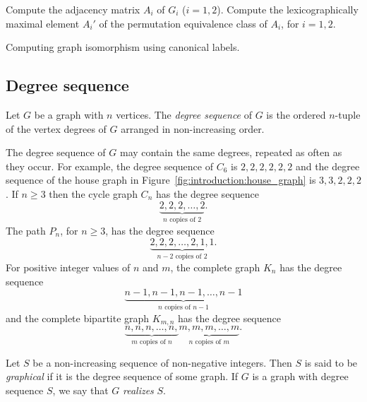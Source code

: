\begin{algorithm}[!htpb]
\dontprintsemicolon  %
\BlankLine
Compute the adjacency matrix $A_i$ of $G_i$ ($i = 1, 2$).\;
Compute the lexicographically maximal element $A_i'$ of the
permutation equivalence class of $A_i$, for $i = 1, 2$.\;
\caption{Computing graph isomorphism using canonical labels.}
\label{alg:introduction:graph_isomorphism_canonical_labels}
\end{algorithm}



\subsection{Degree sequence}

Let $G$ be a graph with $n$ vertices. The \emph{degree sequence} of
$G$ is the ordered $n$-tuple of the vertex degrees of $G$ arranged in
non-increasing order.

The degree sequence of $G$ may contain the same degrees, repeated as
often as they occur. For example, the degree sequence of $C_6$ is
$2, 2, 2, 2, 2, 2$ and the degree sequence of the house graph in
Figure~\ref{fig:introduction:house_graph} is $3, 3, 2, 2, 2$. If
$n \geq 3$ then the cycle graph $C_n$ has the degree sequence
\[
\underbrace{2, 2, 2, \dots, 2}_{n \text{ copies of } 2}.
\]
The path $P_n$, for $n \geq 3$, has the degree sequence
\[
\underbrace{2, 2, 2, \dots, 2, 1, 1}_{n - 2 \text{ copies of } 2}.
\]
For positive integer values of $n$ and $m$, the complete graph $K_n$
has the degree sequence
\[
\underbrace{n-1, n-1, n-1, \dots, n-1}_{n \text{ copies of } n-1}
\]
and the complete bipartite graph $K_{m,n}$ has the degree sequence
\[
\underbrace{n, n, n, \dots, n,}_{m \text{ copies of } n}
\underbrace{m, m, m, \dots, m}_{n \text{ copies of } m}.
\]

Let $S$ be a non-increasing sequence of non-negative integers. Then
$S$ is said to be \emph{graphical} if it is the degree sequence of
some graph. If $G$ is a graph with degree sequence $S$, we say that
$G$ \emph{realizes} $S$.

